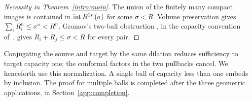 \begin{proof}[Necessity in Theorem~\ref{intro:main}]
The union of the finitely many compact images is contained in
\(\operatorname{int} B^{2n}(\sigma)\) for some \(\sigma<R\).
Volume preservation gives
\(\sum_iR_i^n\le\sigma^n<R^n\). Gromov's two-ball obstruction
\cite[Section~0.3.B]{Gromov1985}, in the capacity convention
of~\cite[Theorem~1.1]{SiegelYao2025}, gives
\(R_i+R_j\le\sigma<R\) for every pair.
\end{proof}

Conjugating the source and target by the same dilation reduces
sufficiency to target capacity one; the conformal factors in the two
pullbacks cancel. We henceforth use this normalization. A single ball
of capacity less than one embeds by inclusion. The proof for multiple
balls is completed after the three geometric applications, in
Section~\ref{app:completion}.

